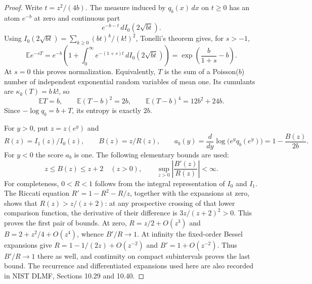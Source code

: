 \begin{proof}
Write $t=z^2/(4b)$.  The measure induced by $q_b(x)\,dx$ on $t\geq0$
has an atom $e^{-b}$ at zero and continuous part
\[
 e^{-b-t}\,dI_0(2\sqrt{bt}).
\]
Using $I_0(2\sqrt{bt})=\sum_{k\geq0}(bt)^k/(k!)^2$, Tonelli's theorem
gives, for $s>-1$,
\begin{equation}\label{eq:CL-compound-Poisson}
 \mathbb E e^{-sT}
   =e^{-b}\left(1+\int_0^\infty
       e^{-(1+s)t}\,dI_0(2\sqrt{bt})\right)
   =\exp\!\left(\frac{b}{1+s}-b\right).
\end{equation}
At $s=0$ this proves normalization.  Equivalently, $T$ is the sum of
a Poisson($b$) number of independent exponential random variables of
mean one.  Its cumulants are $\kappa_k(T)=b\,k!$, so
\begin{equation}\label{eq:CL-moments}
 \mathbb ET=b,\qquad
 \mathbb E(T-b)^2=2b,\qquad
 \mathbb E(T-b)^4=12b^2+24b.
\end{equation}
Since $-\log q_b=b+T$, its entropy is exactly $2b$.

For $y>0$, put $z=z(e^y)$ and
\[
 R(z)=I_1(z)/I_0(z),\qquad B(z)=z/R(z),\qquad
 a_b(y)=\frac{d}{dy}\log\bigl(e^yq_b(e^y)\bigr)
        =1-\frac{B(z)}{2b}.
\]
For $y<0$ the score $a_b$ is one.  The following elementary bounds
are used:
\begin{equation}\label{eq:bessel-ratio-bounds}
 z\leq B(z)\leq z+2\quad(z>0),\qquad
 \sup_{z>0}\left|\frac{B'(z)}{R(z)}\right|<\infty.
\end{equation}
For completeness, $0<R<1$ follows from the integral representation
of $I_0$ and $I_1$.  The Riccati equation
$R'=1-R^2-R/z$, together with the expansions at zero, shows that
$R(z)>z/(z+2)$: at any prospective crossing of that lower comparison
function, the derivative of their difference is
$3z/(z+2)^2>0$.  This proves the first pair of bounds.
At zero, $R=z/2+O(z^3)$ and $B=2+z^2/4+O(z^4)$, whence
$B'/R\to1$.  At infinity the fixed-order Bessel expansions give
$R=1-1/(2z)+O(z^{-2})$ and $B'=1+O(z^{-2})$.
Thus $B'/R\to1$ there as well, and continuity on compact subintervals
proves the last bound.  The recurrence and differentiated expansions
used here are also recorded in NIST DLMF, Sections 10.29 and 10.40.


\end{proof}
